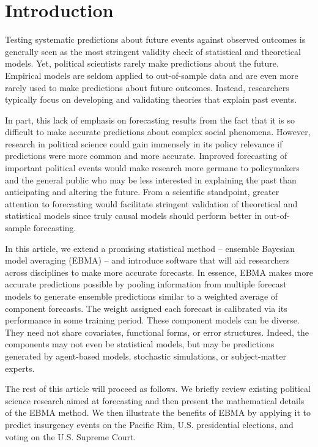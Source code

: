 

\section{Introduction}
Testing systematic predictions about future events against observed
outcomes is generally seen as the most stringent validity check of
statistical and theoretical models.  Yet, political scientists rarely
make predictions about the future.  Empirical models are seldom
applied to out-of-sample data and are even more rarely used to make
predictions about future outcomes. Instead, researchers typically
focus on developing and validating theories that explain past events.

In part, this lack of emphasis on forecasting results from the fact
that it is so difficult to make accurate predictions about complex
social phenomena. However, research in political science could gain
immensely in its policy relevance if predictions were more common and
more accurate.  Improved forecasting of important political events
would make research more germane to policymakers and the general
public who may be less interested in explaining the past than
anticipating and altering the future.  From a scientific standpoint,
greater attention to forecasting would facilitate stringent validation
of theoretical and statistical models since truly causal models should
perform better in out-of-sample forecasting.

In this article, we extend a promising statistical method -- ensemble
Bayesian model averaging (EBMA) -- and introduce software that will
aid researchers across disciplines to make more accurate forecasts.
In essence, EBMA makes more accurate predictions possible by pooling
information from multiple forecast models to generate ensemble
predictions similar to a weighted average of component forecasts. The
weight assigned each forecast is calibrated via its performance in
some training period.  These component models can be diverse.  They
need not share covariates, functional forms, or error
structures. Indeed, the components may not even be statistical models,
but may be predictions generated by agent-based models, stochastic
simulations, or subject-matter experts.

The rest of this article will proceed as follows. We briefly review
existing political science research aimed at forecasting and then
present the mathematical details of the EBMA method. We then
illustrate the benefits of EBMA by applying it to predict insurgency
events on the Pacific Rim, U.S. presidential elections, and voting on
the U.S. Supreme Court.

